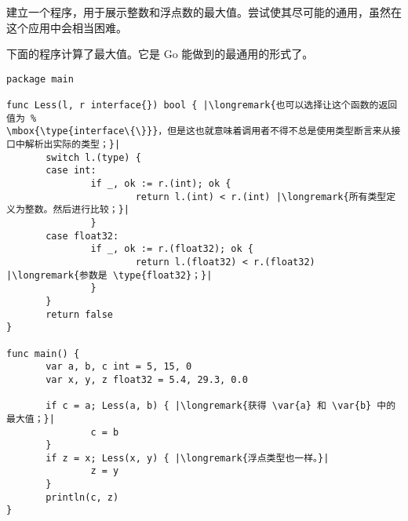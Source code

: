 \begin{Exercise}[title={接口和 max()},difficulty=5]
\Question
建立一个程序，用于展示整数和浮点数的最大值。尝试使其尽可能的通用，虽然在这个应用中会相当困难。
\end{Exercise}

\begin{Answer}
\Question
下面的程序计算了最大值。它是 Go 能做到的最通用的形式了。

\begin{lstlisting}[caption="通用的计算最大值"]
package main

func Less(l, r interface{}) bool { |\longremark{也可以选择让这个函数的返回值为 %
\mbox{\type{interface\{\}}}，但是这也就意味着调用者不得不总是使用类型断言来从接口中解析出实际的类型；}|
       switch l.(type) {
       case int:
               if _, ok := r.(int); ok {
                       return l.(int) < r.(int) |\longremark{所有类型定义为整数。然后进行比较；}|
               }
       case float32:
               if _, ok := r.(float32); ok {
                       return l.(float32) < r.(float32) |\longremark{参数是 \type{float32}；}|
               }
       }
       return false
}

func main() {
       var a, b, c int = 5, 15, 0
       var x, y, z float32 = 5.4, 29.3, 0.0

       if c = a; Less(a, b) { |\longremark{获得 \var{a} 和 \var{b} 中的最大值；}|
               c = b
       }
       if z = x; Less(x, y) { |\longremark{浮点类型也一样。}|
               z = y
       }
       println(c, z)
}
\end{lstlisting}
\showremarks
\end{Answer}
